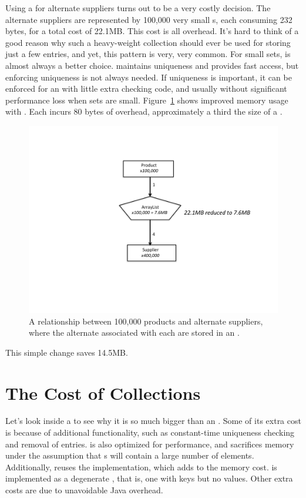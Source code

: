 Using a  for alternate suppliers turns out to be a
very costly decision. The alternate suppliers are represented by 100,000
very small s, each consuming 232 bytes, for a total cost of 22.1MB. 
This cost is all overhead.
It's hard to think of a good reason why such a heavy-weight collection should ever be used
 for storing just a few entries, and yet, this pattern is very, very common. For
 small sets,  is almost always a better choice.  maintains uniqueness
  and provides fast access, but enforcing uniqueness
is not always needed. If uniqueness is
important, it can be enforced for an  
 with  little extra checking code, and usually without significant performance
 loss when sets are small. Figure~\ref{fig:product-arraylist} shows improved
 memory usage with . Each  incurs 80 bytes of overhead,
approximately a third the size of a .
 \begin{figure}
  \centering
 \includegraphics[width=.80\textwidth]{part1/Figures/collections/product-arraylist.pdf}
 \caption{A relationship between 100,000 products and alternate suppliers,
 where the alternate  associated with each  are
 stored in an .}
  \label{fig:product-arraylist}
\end{figure}
This simple change saves 14.5MB. 


\section{The Cost of Collections}
\label{sec:collectioncost}
Let's look inside a  to see why it is so much bigger than an
. Some of its extra cost is because of additional functionality,
such as constant-time uniqueness checking and removal of entries.
 is also optimized for performance, and sacrifices memory 
under the assumption that s will contain a large number of
elements. Additionally,  reuses the 
implementation, which adds to the memory cost.
 is implemented as a degenerate
, that is, one with keys but no values. Other extra costs
are due to unavoidable Java overhead. 

